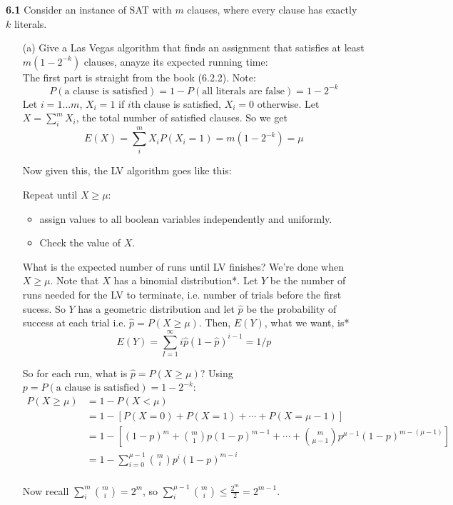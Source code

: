 \documentclass[10pt]{article}
\begin{document}
\textbf{6.1} 
\label{Q6.1}
Consider an instance of SAT with $m$ clauses, where every clause has
exactly $k$ literals.
\begin{enumerate}
\item[(a)]  Give a Las Vegas algorithm that finds an
assignment that satisfies at least $m(1-2^{-k})$ clauses, anayze its
expected running time:\\

The first part is straight from the book (6.2.2). Note:
$$P(\text{a clause is satisfied}) = 1 - P(\text{all literals are
  false}) = 1 - 2^{-k}$$
Let $i= 1\dots m$, $X_i = 1$ if $i$th clause is satisfied, $X_i=0$
otherwise. 
Let $X = \sum_{i}^m X_i$, the total number of satisfied clauses.
So we get $$E(X) = \sum_i^m X_iP(X_i=1) = m(1-2^{-k}) = \mu$$

Now given this, the LV algorithm goes like this:

Repeat until $X \ge \mu$:
\begin{itemize}
\item assign values to all boolean variables independently and uniformly.
\item Check the value of $X$.
\end{itemize}

What is the expected number of runs until LV finishes? We're done
when $X \ge \mu$. Note that $X$
has a binomial distribution*. Let $Y$ be the number of runs needed for
the LV to terminate, i.e. number of trials before the first sucess. So
$Y$ has a geometric distribution and let $\hat{p}$ be the probability
of success at each trial i.e. $\hat{p} = P(X\ge \mu)$. Then, $E(Y)$, what we
want, is*
\begin{equation}
  \label{eq:1}
E(Y) = \sum_{I=1}^\infty i\hat{p}(1-\hat{p})^{i-1} = 1/p
\end{equation}


So for each run, what is $\hat{p} = P(X\ge \mu)$? Using $p
= P(\text{a clause is satisfied}) = 1 - 2^{-k}$:
\begin{align*}
  P(X\ge \mu) &= 1 - P(X < \mu)\\
&= 1 - [ P(X=0) + P(X=1) + \cdots + P(X = \mu -1)]\\
&= 1 - [(1-p)^m + {m \choose 1}p(1-p)^{m-1} + \cdots + {m
 \choose \mu - 1} p^{\mu-1}(1-p)^{m -(\mu -1)}]\\
&= 1 - \sum_{i=0}^{\mu-1}{m \choose i}p^i(1-p)^{m-i}\\
\end{align*}

Now recall $\sum_i^m{m \choose i} = 2^m$, so $\sum_i^{\mu -1} {m
  \choose i} \le \frac{2^m}{2} = 2^{m-1}$. 


\end{enumerate}
\end{document}
